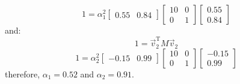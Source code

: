 \documentclass[12pt,letter]{article}
\begin{document}
\begin{example}
	\begin{equation}
		1 = \alpha_1^2 \begin{bmatrix} 0.55 &  0.84 \end{bmatrix} \begin{bmatrix} 10 & 0 \\    0  & 1 \end{bmatrix}  \begin{bmatrix} 0.55 \\  0.84 \end{bmatrix}
	\end{equation}
	and:
	\begin{equation}
		1 = \vec{v}_2^\text{T} M \vec{v}_2 
	\end{equation}
	\begin{equation}
		1 = \alpha_2^2 \begin{bmatrix} -0.15 &  0.99 \end{bmatrix} \begin{bmatrix} 10 & 0 \\    0  & 1 \end{bmatrix}  \begin{bmatrix} -0.15 \\  0.99 \end{bmatrix}
	\end{equation}
	therefore, $\alpha_1=0.52$ and $\alpha_2=0.91$.
	

\end{example}
\end{document}
